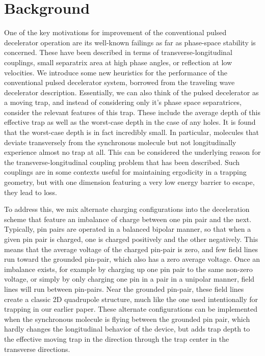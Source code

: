 \documentclass[%
 reprint,
 amsmath,amssymb,
 aps,
pra,
]{revtex4-1}
\begin{document}
\section{Background}
One of the key motivations for improvement of the conventional pulsed decelerator operation are its well-known failings as far as phase-space stability is concerned. These have been described in terms of transverse-longitudinal couplings, small separatrix area at high phase angles, or reflection at low velocities. We introduce some new heuristics for the performance of the conventional pulsed decelerator system, borrowed from the traveling wave decelerator description. Essentially, we can also think of the pulsed decelerator as a moving trap, and instead of considering only it's phase space separatrices, consider the relevant features of this trap. These include the average depth of this effective trap as well as the worst-case depth in the case of any holes. It is found that the worst-case depth is in fact incredibly small. In particular, molecules that deviate transversely from the synchronous molecule but not longitudinally experience almost no trap at all. This can be considered the underlying reason for the transverse-longitudinal coupling problem that has been described. Such couplings are in some contexts useful for maintaining ergodicity in a trapping geometry, but with one dimension featuring a very low energy barrier to escape, they lead to loss.

To address this, we mix alternate charging configurations into the deceleration scheme that feature an imbalance of charge between one pin pair and the next. Typically, pin pairs are operated in a balanced bipolar manner, so that when a given pin pair is charged, one is charged positively and the other negatively. This means that the average voltage of the charged pin-pair is zero, and few field lines run toward the grounded pin-pair, which also has a zero average voltage. Once an imbalance exists, for example by charging up one pin pair to the same non-zero voltage, or simply by only charging one pin in a pair in a unipolar manner, field lines will run between pin-pairs. Near the grounded pin-pair, these field lines create a classic 2D quadrupole structure, much like the one used intentionally for trapping in our earlier paper. These alternate configurations can be implemented when the synchronous molecule is flying between the grounded pin pair, which hardly changes the longitudinal behavior of the device, but adds trap depth to the effective moving trap in the direction through the trap center in the transverse directions.
\end{document}
